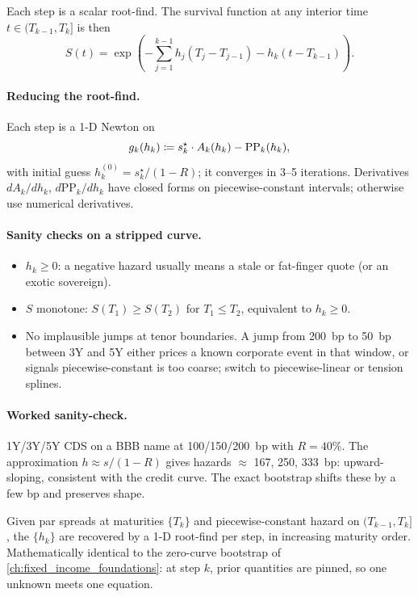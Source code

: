 Each step is a scalar root-find.  The survival function at any
interior time $t \in (T_{k-1}, T_k]$ is then
\[
  S(t)
  = \exp\!\left(-\sum_{j=1}^{k-1} h_j (T_j - T_{j-1})
                - h_k (t - T_{k-1})\right).
\]

\paragraph{Reducing the root-find.}  Each step is a 1-D Newton on
\[
  g_k(h_k) \coloneqq s_k^\star \cdot A_k(h_k) - \mathrm{PP}_k(h_k),
\]
with initial guess $h_k^{(0)} = s_k^\star/(1-R)$; it converges in
3--5 iterations.  Derivatives $dA_k/dh_k$, $d\mathrm{PP}_k/dh_k$
have closed forms on piecewise-constant intervals; otherwise use
numerical derivatives.

\paragraph{Sanity checks on a stripped curve.}
\begin{itemize}
  \item $h_k \ge 0$: a negative hazard usually means a stale or
    fat-finger quote (or an exotic sovereign).
  \item $S$ monotone: $S(T_1) \ge S(T_2)$ for $T_1 \le T_2$,
    equivalent to $h_k \ge 0$.
  \item No implausible jumps at tenor boundaries.  A jump from
    200~bp to 50~bp between 3Y and 5Y either prices a known
    corporate event in that window, or signals piecewise-constant
    is too coarse; switch to piecewise-linear or tension splines.
\end{itemize}

\paragraph{Worked sanity-check.}  1Y/3Y/5Y CDS on a BBB name at
100/150/200~bp with $R = 40\%$.  The approximation $h \approx
s/(1-R)$ gives hazards $\approx$ 167, 250, 333~bp: upward-sloping,
consistent with the credit curve.  The exact bootstrap shifts these
by a few bp and preserves shape.

\begin{keyfactbox}
Given par spreads at maturities $\{T_k\}$ and piecewise-constant
hazard on $(T_{k-1}, T_k]$, the $\{h_k\}$ are recovered by a 1-D
root-find per step, in increasing maturity order.  Mathematically
identical to the zero-curve bootstrap of
\cref{ch:fixed_income_foundations}: at step $k$, prior quantities
are pinned, so one unknown meets one equation.
\end{keyfactbox}

